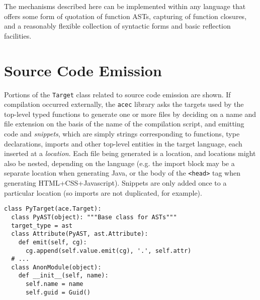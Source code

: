 \documentclass[10pt,preprint]{sigplanconf}
\begin{document}
{The mechanisms described here can be implemented within any language that offers some form of quotation of function ASTs, capturing of function closures, and a reasonably flexible collection of syntactic forms and basic reflection facilities.%








\appendix
\section{Source Code Emission}
Portions of the \verb|Target| class related to source code emission are shown. If compilation occurred externally, the \verb|acec| library asks the targets used by the top-level typed functions to generate one or more files by deciding on a name and file extension on the basis of the name of the compilation script, and emitting code and \emph{snippets}, which are simply strings corresponding to functions, type declarations, imports and other top-level entities in the target language, each inserted at a \emph{location}. Each file being generated is a location, and locations might also be nested, depending on the language (e.g. the import block may be a separate location when generating Java, or the body of the \verb|<head>| tag when generating HTML+CSS+Javascript). Snippets are only added once to a particular location (so imports are not duplicated, for example).

\begin{codelisting}
\begin{lstlisting}
class PyTarget(ace.Target):
  class PyAST(object): """Base class for ASTs"""
  target_type = ast
  class Attribute(PyAST, ast.Attribute):
    def emit(self, cg):
      cg.append(self.value.emit(cg), '.', self.attr)
  # ... 
  class AnonModule(object): 
    def __init__(self, name): 
      self.name = name
      self.guid = Guid()
      

\end{lstlisting}
\end{codelisting}}
\end{document}
